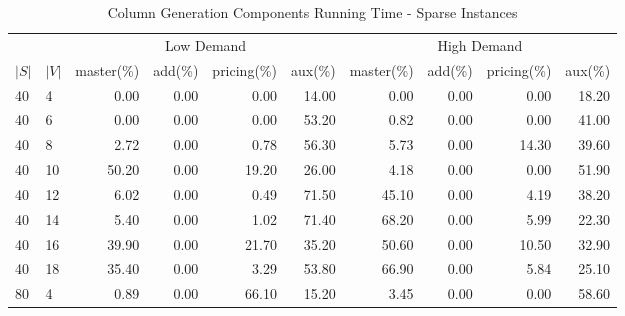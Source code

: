 \begin{table*}[h]
\begin{center}
\caption{Column Generation Components Running Time - Sparse Instances}\label{tab:compsparse}
\footnotesize
\begin{tabular} {l l | r r r r | r r r r }
\hline
     &                 &  \multicolumn{4}{c|}{Low Demand}                            & \multicolumn{4}{c}{High Demand} \\
$|S|$&           $|V|$ &  master(\%) &  add(\%)      &   pricing(\%)            &  aux(\%)     & master(\%) &            add(\%)       &             pricing(\%)  &  aux(\%) \\
\hline
40   &             4   &  0.00   &            0.00             &               0.00   &  14.00  &  0.00   &            0.00             &               0.00   &  18.20  \\
40   &             6   &  0.00   &            0.00             &               0.00   &  53.20  &  0.82   &            0.00             &               0.00   &  41.00  \\
40   &             8   &  2.72   &            0.00             &               0.78   &  56.30  &  5.73   &            0.00             &               14.30  &  39.60  \\
40   &             10  &  50.20  &            0.00             &               19.20  &  26.00  &  4.18   &            0.00             &               0.00   &  51.90  \\
40   &             12  &  6.02   &            0.00             &               0.49   &  71.50  &  45.10  &            0.00             &               4.19   &  38.20  \\
40   &             14  &  5.40   &            0.00             &               1.02   &  71.40  &  68.20  &            0.00             &               5.99   &  22.30  \\
40   &             16  &  39.90  &            0.00             &               21.70  &  35.20  &  50.60  &            0.00             &               10.50  &  32.90  \\
40   &             18  &  35.40  &            0.00             &               3.29   &  53.80  &  66.90  &            0.00             &               5.84   &  25.10  \\
80   &             4   &  0.89   &            0.00             &               66.10  &  15.20  &  3.45   &            0.00             &               0.00   &  58.60  \\

\end{tabular}
\end{center}
\end{table*}
